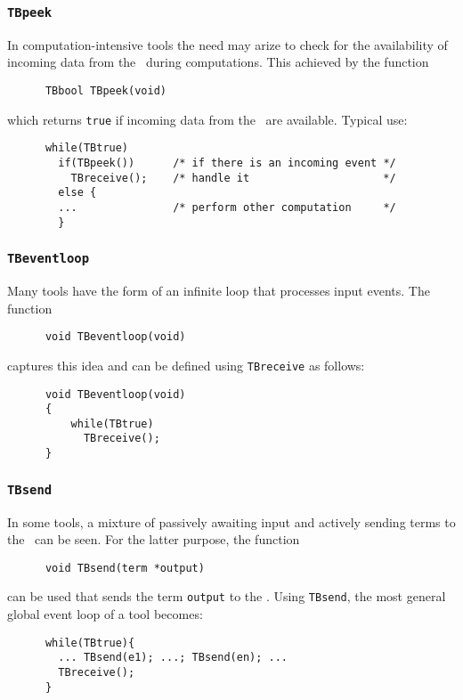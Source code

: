 \subsubsection{\label{TBpeek}{\tt TBpeek}}
In computation-intensive tools the need may arize to
check for the availability of incoming data from the \TB\ during
computations. This achieved by the function
\begin{verbatim}
      TBbool TBpeek(void)
\end{verbatim}
which returns {\tt true} if incoming data from the \TB\ are available.
Typical use:
\begin{verbatim}
      while(TBtrue)
        if(TBpeek())      /* if there is an incoming event */
          TBreceive();    /* handle it                     */
        else {
        ...               /* perform other computation     */
        }
\end{verbatim}



\subsubsection{\label{TBeventloop}{\tt TBeventloop}}
Many tools have the form of an infinite loop
that processes input events.
The function
\begin{verbatim}
      void TBeventloop(void)
\end{verbatim}
captures this idea and can be
defined using {\tt TBreceive} as follows:
\begin{verbatim}
      void TBeventloop(void)
      {
          while(TBtrue)
            TBreceive();
      }
\end{verbatim}

\subsubsection{\label{TBsend}{\tt TBsend}}

In some tools, a mixture of passively awaiting input
and actively sending terms to the \TB\ can be seen.
For the latter purpose, the function
\begin{verbatim}
      void TBsend(term *output)
\end{verbatim}
can be used that sends the term {\tt output} to the \TB.
Using {\tt TBsend}, the most general global event loop of a tool becomes:

\begin{verbatim}
      while(TBtrue){
        ... TBsend(e1); ...; TBsend(en); ...
        TBreceive();
      }
\end{verbatim}

